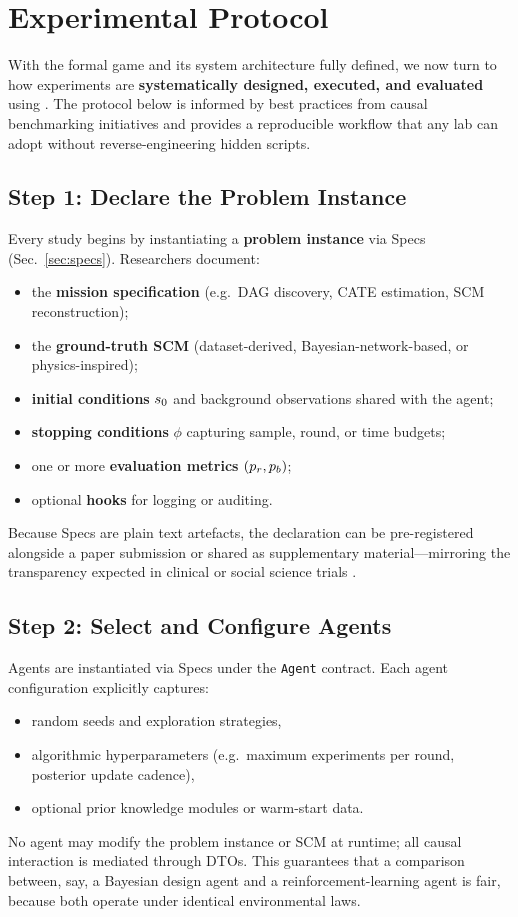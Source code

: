 \section{Experimental Protocol}
\label{sec:experimental_protocol}
With the formal game and its system architecture fully defined, we now turn to how experiments are \textbf{systematically designed, executed, and evaluated} using \game.  
The protocol below is informed by best practices from causal benchmarking initiatives \citep{CauseBox2021,CausalBench2024,RealCause2021} and provides a reproducible workflow that any lab can adopt without reverse-engineering hidden scripts.

\subsection{Step 1: Declare the Problem Instance}
Every study begins by instantiating a \textbf{problem instance} via Specs (Sec.~\ref{sec:specs}).  
Researchers document:
\begin{itemize}
    \item the \textbf{mission specification} (e.g.\ DAG discovery, CATE estimation, SCM reconstruction);
    \item the \textbf{ground-truth SCM} (dataset-derived, Bayesian-network-based, or physics-inspired);
    \item \textbf{initial conditions} $s_0$ and background observations shared with the agent;
    \item \textbf{stopping conditions} $\phi$ capturing sample, round, or time budgets;
    \item one or more \textbf{evaluation metrics} $(p_r, p_b)$;
    \item optional \textbf{hooks} for logging or auditing.
\end{itemize}
Because Specs are plain text artefacts, the declaration can be pre-registered alongside a paper submission or shared as supplementary material—mirroring the transparency expected in clinical or social science trials \citep{Prosperi2020CausalIAA,Athey2016TheSOA}.

\subsection{Step 2: Select and Configure Agents}
Agents are instantiated via Specs under the \texttt{Agent} contract.  
Each agent configuration explicitly captures:
\begin{itemize}
    \item random seeds and exploration strategies,
    \item algorithmic hyperparameters (e.g.\ maximum experiments per round, posterior update cadence),
    \item optional prior knowledge modules or warm-start data.
\end{itemize}
No agent may modify the problem instance or SCM at runtime; all causal interaction is mediated through DTOs. This guarantees that a comparison between, say, a Bayesian design agent and a reinforcement-learning agent is fair, because both operate under identical environmental laws.

